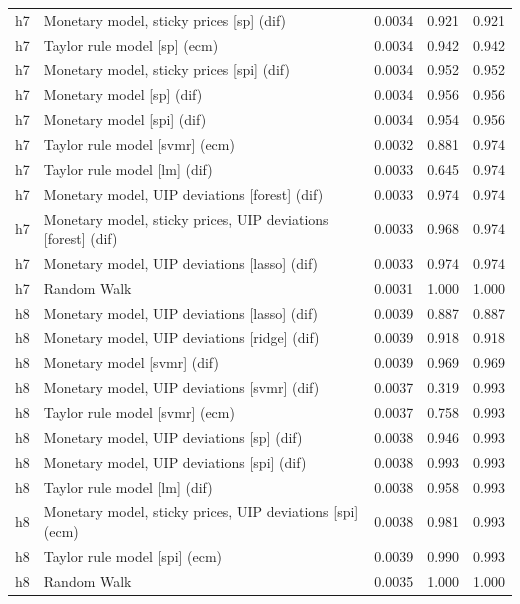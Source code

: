 \begin{ThreePartTable}
\begin{longtable}[t]{cp{5.5cm}ccc}
\addlinespace
h7 & \raggedright Monetary model, sticky prices [sp] (dif) & 0.0034 & 0.921 & 0.921\\
h7 & \raggedright Taylor rule model [sp] (ecm) & 0.0034 & 0.942 & 0.942\\
h7 & \raggedright Monetary model, sticky prices [spi] (dif) & 0.0034 & 0.952 & 0.952\\
h7 & \raggedright Monetary model [sp] (dif) & 0.0034 & 0.956 & 0.956\\
h7 & \raggedright Monetary model [spi] (dif) & 0.0034 & 0.954 & 0.956\\
h7 & \raggedright Taylor rule model [svmr] (ecm) & 0.0032 & 0.881 & 0.974\\
h7 & \raggedright Taylor rule model [lm] (dif) & 0.0033 & 0.645 & 0.974\\
h7 & \raggedright Monetary model, UIP deviations [forest] (dif) & 0.0033 & 0.974 & 0.974\\
h7 & \raggedright Monetary model, sticky prices, UIP deviations [forest] (dif) & 0.0033 & 0.968 & 0.974\\
h7 & \raggedright Monetary model, UIP deviations [lasso] (dif) & 0.0033 & 0.974 & 0.974\\
h7 & \raggedright Random Walk & 0.0031 & 1.000 & 1.000\\
\addlinespace
h8 & \raggedright Monetary model, UIP deviations [lasso] (dif) & 0.0039 & 0.887 & 0.887\\
h8 & \raggedright Monetary model, UIP deviations [ridge] (dif) & 0.0039 & 0.918 & 0.918\\
h8 & \raggedright Monetary model [svmr] (dif) & 0.0039 & 0.969 & 0.969\\
h8 & \raggedright Monetary model, UIP deviations [svmr] (dif) & 0.0037 & 0.319 & 0.993\\
h8 & \raggedright Taylor rule model [svmr] (ecm) & 0.0037 & 0.758 & 0.993\\
h8 & \raggedright Monetary model, UIP deviations [sp] (dif) & 0.0038 & 0.946 & 0.993\\
h8 & \raggedright Monetary model, UIP deviations [spi] (dif) & 0.0038 & 0.993 & 0.993\\
h8 & \raggedright Taylor rule model [lm] (dif) & 0.0038 & 0.958 & 0.993\\
h8 & \raggedright Monetary model, sticky prices, UIP deviations [spi] (ecm) & 0.0038 & 0.981 & 0.993\\
h8 & \raggedright Taylor rule model [spi] (ecm) & 0.0039 & 0.990 & 0.993\\
h8 & \raggedright Random Walk & 0.0035 & 1.000 & 1.000\\

\end{longtable}
\end{ThreePartTable}
